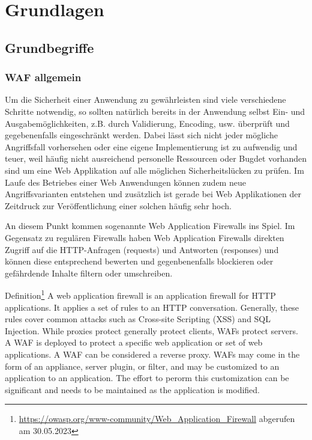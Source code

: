 \chapter{Grundlagen}


\section{Grundbegriffe}
\subsection{WAF allgemein}
Um die Sicherheit einer Anwendung zu gewährleisten sind viele verschiedene Schritte notwendig, so sollten natürlich bereits in der Anwendung selbst Ein- und Ausgabemöglichkeiten, z.B. durch Validierung, Encoding, usw. überprüft und gegebenenfalls eingeschränkt werden. Dabei lässt sich nicht jeder mögliche Angriffsfall vorhersehen oder eine eigene Implementierung ist zu aufwendig und teuer, weil häufig nicht ausreichend personelle Ressourcen oder Bugdet vorhanden sind um eine Web Applikation auf alle möglichen Sicherheitslücken zu prüfen. Im Laufe des Betriebes einer Web Anwendungen können zudem neue Angriffsvarianten entstehen und zusätzlich ist gerade bei Web Applikationen der Zeitdruck zur Veröffentlichung einer solchen häufig sehr hoch.

An diesem Punkt kommen sogenannte Web Application Firewalls ins Spiel. Im Gegensatz zu regulären Firewalls haben Web Application Firewalls direkten Zugriff auf die HTTP-Anfragen (requests) und Antworten (responses) und können diese entsprechend bewerten und gegenbenenfalls blockieren oder gefährdende Inhalte filtern oder umschreiben.

\textcolor{bhtGray}{ Definition\footnote{\url{https://owasp.org/www-community/Web_Application_Firewall} abgerufen am 30.05.2023}} A web application firewall is an application firewall for HTTP applications. It applies a set of rules to an HTTP conversation. Generally, these rules cover common attacks such as Cross-site Scripting (XSS) and SQL Injection. While proxies protect generally protect clients, WAFs protect servers. A WAF is deployed to protect a specific web application or set of web applications. A WAF can be considered a reverse proxy. WAFs may come in the form of an appliance, server plugin, or filter, and may be customized to an application to an application. The effort to perorm this customization can be significant and needs to be maintained as the application is modified.

